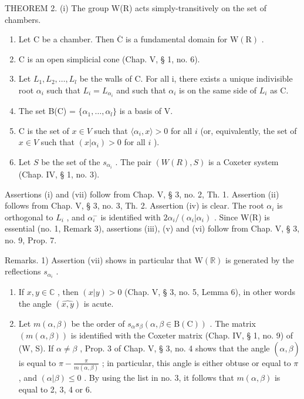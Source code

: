 THEOREM 2. (i) The group W(R) acts simply-transitively on the set of chambers.

\begin{enumerate}
\def\labelenumi{(\roman{enumi})}
\setcounter{enumi}{1}
\item
  Let \(\mathrm{C}\) be a chamber. Then \(\overline{\mathrm{C}}\) is a fundamental domain for \(\mathrm{W}(\mathrm{R})\) .
\item
  C is an open simplicial cone (Chap. V, § 1, no. 6).
\item
  Let \(L_{1}, L_{2}, \ldots, L_{l}\) be the walls of C. For all i, there exists a unique indivisible root \(\alpha_{i}\) such that \(L_{i} = L_{\alpha_{i}}\) and such that \(\alpha_{i}\) is on the same side of \(L_{i}\) as C.
\item
  The set B(C) = \(\{\alpha_{1},\ldots,\alpha_{l}\}\) is a basis of V.
\item
  C is the set of \(x \in V\) such that \(\langle \alpha_i, x \rangle > 0\) for all \(i\) (or, equivalently, the set of \(x \in V\) such that \((x|\alpha_i) > 0\) for all \(i\) ).
\item
  Let \(S\) be the set of the \(s_{\alpha_i}\) . The pair \((W(R), S)\) is a Coxeter system (Chap. IV, § 1, no. 3).
\end{enumerate}

Assertions (i) and (vii) follow from Chap. V, § 3, no. 2, Th. 1. Assertion (ii) follows from Chap. V, § 3, no. 3, Th. 2. Assertion (iv) is clear. The root \(\alpha_{i}\) is orthogonal to \(L_{i}\) , and \(\alpha_{i}^{-}\) is identified with \(2\alpha_{i}/(\alpha_{i}|\alpha_{i})\) . Since W(R) is essential (no. 1, Remark 3), assertions (iii), (v) and (vi) follow from Chap. V, § 3, no. 9, Prop. 7.

Remarks. 1) Assertion (vii) shows in particular that \(\mathrm{W}(\mathbb{R})\) is generated by the reflections \(s_{\alpha_i}\) .

\begin{enumerate}
\def\labelenumi{\arabic{enumi})}
\setcounter{enumi}{1}
\item
  If \(x, y \in \mathbb{C}\) , then \((x|y) > 0\) (Chap. V, § 3, no. 5, Lemma 6), in other words the angle \((\widehat{x,y})\) is acute.
\item
  Let \(m(\alpha, \beta)\) be the order of \(s_{\alpha} s_{\beta} (\alpha, \beta \in \mathrm{B}(\mathrm{C}))\) . The matrix \((m(\alpha, \beta))\) is identified with the Coxeter matrix (Chap. IV, § 1, no. 9) of (W, S). If \(\alpha \neq \beta\) , Prop. 3 of Chap. V, § 3, no. 4 shows that the angle \((\widehat{\alpha, \beta})\) is equal to \(\pi - \frac{\pi}{m(\alpha, \beta)}\) ; in particular, this angle is either obtuse or equal to \(\pi\) , and \((\alpha | \beta) \leqslant 0\) . By using the list in no. 3, it follows that \(m(\alpha, \beta)\) is equal to 2, 3, 4 or 6.
\end{enumerate}

